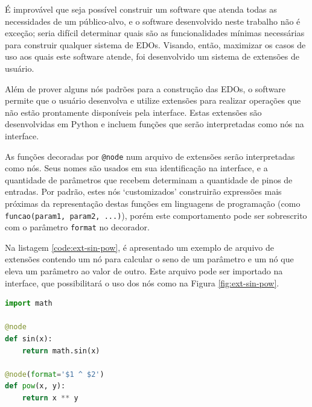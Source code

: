 \documentclass[
	12pt,				%
	openright,			%
	oneside,			%
	a4paper,			%
	main=brazil,
	english,			%
	]{ufsj-abntex2}
\begin{document}
É improvável que seja possível construir um software que atenda todas as necessidades de um público-alvo, e o software desenvolvido neste trabalho não é exceção; seria difícil determinar quais são as funcionalidades mínimas necessárias para construir qualquer sistema de EDOs. Visando, então, maximizar os casos de uso aos quais este software atende, foi desenvolvido um sistema de extensões de usuário. 

Além de prover alguns nós padrões para a construção das EDOs, o software permite que o usuário desenvolva e utilize extensões para realizar operações que não estão prontamente disponíveis pela interface. Estas extensões são desenvolvidas em Python e incluem funções que serão interpretadas como nós na interface.

As funções decoradas por \texttt{@node} num arquivo de extensões serão interpretadas como nós. Seus nomes são usados em sua identificação na interface, e a quantidade de parâmetros que recebem determinam a quantidade de pinos de entradas. Por padrão, estes nós `customizados' construirão expressões mais próximas da representação destas funções em linguagens de programação (como \texttt{funcao(param1, param2, ...)}), porém este comportamento pode ser sobrescrito com o parâmetro \texttt{format} no decorador.

Na listagem \ref{code:ext-sin-pow}, é apresentado um exemplo de arquivo de extensões contendo um nó para calcular o seno de um parâmetro e um nó que eleva um parâmetro ao valor de outro. Este arquivo pode ser importado na interface, que possibilitará o uso dos nós como na Figura \ref{fig:ext-sin-pow}.

\begin{lstlisting}[language=Python, label=code:ext-sin-pow, caption=Exemplo de definição dos nós de extensão seno e potência com código Python válido., float, xleftmargin=.35\textwidth]
import math

@node
def sin(x):
    return math.sin(x)

@node(format='$1 ^ $2')
def pow(x, y):
    return x ** y

\end{lstlisting}
\end{document}
